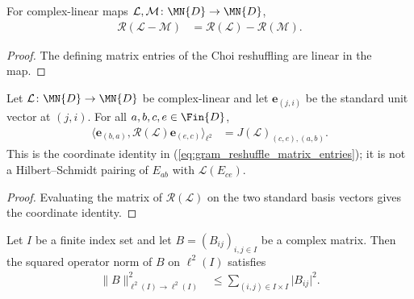 \begin{lemma}
    \label{thm:gram_reshuffle_sub}
    \leanok
    For complex-linear maps
    $\mathcal L,\mathcal M\colon\MN{D}\to\MN{D}$,
    \begin{align}
        \mathscr R(\mathcal L-\mathcal M)
         & =\mathscr R(\mathcal L)-\mathscr R(\mathcal M).
        \label{eq:gram_reshuffle_sub}
    \end{align}
\end{lemma}

\begin{proof}
    \leanok
    The defining matrix entries of the Choi reshuffling are linear in the map.
\end{proof}

\begin{lemma}
    \label{thm:gram_reshuffle_single}
    \leanok
    Let $\mathcal L\colon\MN{D}\to\MN{D}$ be complex-linear and let
    $\mathbf e_{(j,i)}$ be the standard unit vector at $(j,i)$.  For all
    $a,b,c,e\in\Fin{D}$,
    \begin{align}
        \bigl\langle \mathbf e_{(b,a)},
        \mathscr R(\mathcal L)\mathbf e_{(e,c)}\bigr\rangle_{\ell^2}
         & =J(\mathcal L)_{(c,e),(a,b)}.
        \label{eq:gram_reshuffle_single}
    \end{align}
    This is the coordinate identity in
    (\ref{eq:gram_reshuffle_matrix_entries}); it is not a Hilbert--Schmidt pairing of
    $E_{ab}$ with $\mathcal L(E_{ce})$.
\end{lemma}

\begin{proof}
    \leanok
    Evaluating the matrix of $\mathscr R(\mathcal L)$ on the two standard basis
    vectors gives the coordinate identity.
\end{proof}

\begin{lemma}
    \label{thm:euclidean_operator_norm_sq_le_frobenius}
    \leanok
    Let $I$ be a finite index set and let $B=(B_{ij})_{i,j\in I}$ be a complex
    matrix.  Then the squared operator norm of $B$ on $\ell^2(I)$ satisfies
    \begin{align}
        \lVert B\rVert_{\ell^2(I)\to\ell^2(I)}^2
         & \leq \sum_{(i,j)\in I\times I}\lvert B_{ij}\rvert^2.
        \label{eq:euclidean_operator_norm_sq_le_frobenius}
    \end{align}
\end{lemma}

